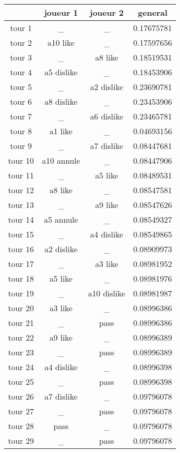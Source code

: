 \documentclass{article}
\begin{document}
\begin{tabular}{|c|c|c|c|}
\hline
& joueur 1 & joueur 2 & general \\
\hline
tour 1 & \_ & \_ & 0.17675781 \\
\hline
tour 2 & a10 like & \_ & 0.17597656 \\
\hline
tour 3 & \_ & a8 like & 0.18519531 \\
\hline
tour 4 & a5 dislike & \_ & 0.18453906 \\
\hline
tour 5 & \_ & a2 dislike & 0.23690781 \\
\hline
tour 6 & a8 dislike & \_ & 0.23453906 \\
\hline
tour 7 & \_ & a6 dislike & 0.23465781 \\
\hline
tour 8 & a1 like & \_ & 0.04693156 \\
\hline
tour 9 & \_ & a7 dislike & 0.08447681 \\
\hline
tour 10 & a10 annule & \_ & 0.08447906 \\
\hline
tour 11 & \_ & a5 like & 0.08489531 \\
\hline
tour 12 & a8 like & \_ & 0.08547581 \\
\hline
tour 13 & \_ & a9 like & 0.08547626 \\
\hline
tour 14 & a5 annule & \_ & 0.08549327 \\
\hline
tour 15 & \_ & a4 dislike & 0.08549865 \\
\hline
tour 16 & a2 dislike & \_ & 0.08909973 \\
\hline
tour 17 & \_ & a3 like & 0.08981952 \\
\hline
tour 18 & a5 like & \_ & 0.08981976 \\
\hline
tour 19 & \_ & a10 dislike & 0.08981987 \\
\hline
tour 20 & a3 like & \_ & 0.08996386 \\
\hline
tour 21 & \_ & pass & 0.08996386 \\
\hline
tour 22 & a9 like & \_ & 0.08996389 \\
\hline
tour 23 & \_ & pass & 0.08996389 \\
\hline
tour 24 & a4 dislike & \_ & 0.08996398 \\
\hline
tour 25 & \_ & pass & 0.08996398 \\
\hline
tour 26 & a7 dislike & \_ & 0.09796078 \\
\hline
tour 27 & \_ & pass & 0.09796078 \\
\hline
tour 28 & pass & \_ & 0.09796078 \\
\hline
tour 29 & \_ & pass & 0.09796078 \\
\hline
\end{tabular}
\end{document}

